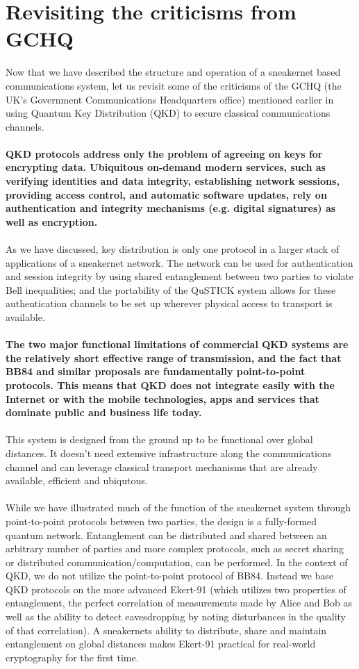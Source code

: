 \documentclass[aps,prl,twocolumn,10pt,nofootinbib]{revtex4}
\begin{document}
\section{Revisiting the criticisms from GCHQ}
Now that we have described the structure and operation of a sneakernet based communications system, let us revisit some of the criticisms of the GCHQ (the UK's Government Communications Headquarters office) mentioned earlier in using Quantum Key Distribution (QKD) to secure classical communications channels.  
\\
\\
{\bf QKD protocols address only the problem of agreeing on keys for encrypting data. Ubiquitous on-demand modern services, such as verifying identities and data integrity, establishing network sessions, providing access control, and automatic software updates, rely on authentication and integrity mechanisms (e.g. digital signatures) as well as encryption.}
\\
\\
As we have discussed, key distribution is only one protocol in a larger stack of applications of a sneakernet network.  The network can be used for authentication and session integrity by using shared entanglement between two parties to violate Bell inequalities; and the portability of the QuSTICK system allows for these authentication channels to be set up wherever physical access to transport is available.
\\
\\
{\bf The two major functional limitations of commercial QKD systems are the relatively short effective range of transmission, and the fact that BB84 and similar proposals are fundamentally point-to-point protocols. This means that QKD does not integrate easily with the Internet or with the mobile technologies, apps and services that dominate public and business life today.}
\\
\\
This system is designed from the ground up to be functional over global distances.  It doesn't need extensive infrastructure along the communications channel and can leverage classical transport mechanisms that are already available, efficient and ubiqutous.  
\\
\\
While we have illustrated much of the function of the sneakernet system through point-to-point protocols between two parties, the design is a fully-formed quantum network.  Entanglement can be distributed and shared between an arbitrary number of parties and more complex protocols, such as secret sharing or distributed communication/computation, can be performed.  In the context of QKD, we do not utilize the point-to-point protocol of BB84.  Instead we base QKD protocols on the more advanced Ekert-91 (which utilizes two properties of entanglement, the perfect correlation of measurements made by Alice and Bob as well as the ability to detect eavesdropping by noting disturbances in the quality of that correlation).  A sneakernets ability to distribute, share and maintain entanglement on global distances makes Ekert-91 practical for real-world cryptography for the first time.
\end{document}
